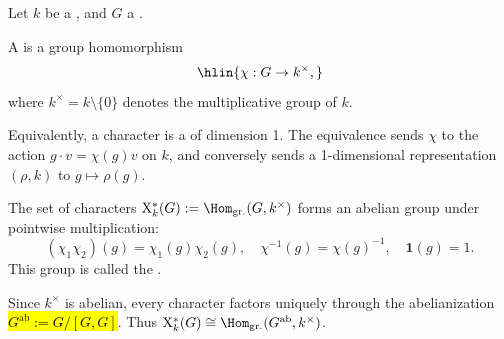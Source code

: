 \begin{definition} \label{definition:character_of_a_group_valued_in_a_field}

    Let $k$ be a , and $G$ a .

    A  is a group homomorphism
    $$\hlin{\chi : G \to k^\times,}$$
    where $k^\times = k \setminus \{0\}$ denotes the multiplicative group of $k$.

    Equivalently, a character is a  of dimension 1. The equivalence sends $\chi$ to the action $g \cdot v = \chi(g)v$ on $k$, and conversely sends a 1-dimensional representation $(\rho, k)$ to $g \mapsto \rho(g)$.

    The set of characters $\mathrm{X}^*_k(G) := \Hom_{\mathrm{gr.}}(G, k^\times)$ forms an abelian group under pointwise multiplication:
    $$ (\chi_1 \chi_2)(g) = \chi_1(g)\chi_2(g), \quad \chi^{-1}(g) = \chi(g)^{-1}, \quad \mathbf{1}(g) = 1. $$
    This group is called the .

    Since $k^\times$ is abelian, every character factors uniquely through the abelianization \hl{$G^{\mathrm{ab}} := G/[G,G]$}. Thus $\mathrm{X}^*_k(G) \cong \Hom_{\mathrm{gr.}}(G^{\mathrm{ab}}, k^\times)$.
\end{definition}
